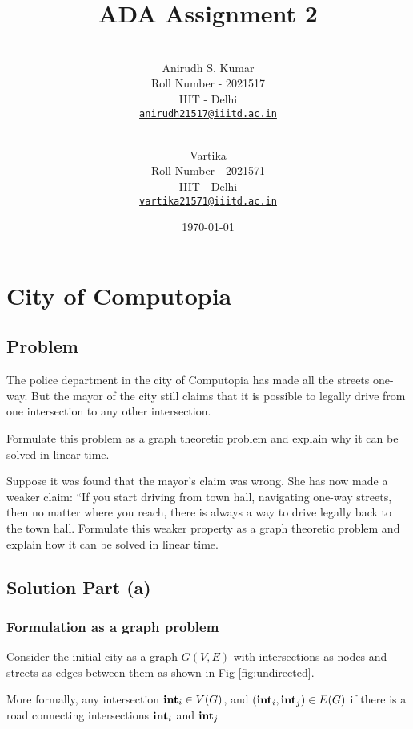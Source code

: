 \documentclass[12pt]{article}
\title{ADA Assignment 2}
\author{
    \\\vspace{0em} Anirudh S. Kumar \\\vspace{-0.5em}
    \footnotesize{Roll Number - 2021517}\\\vspace{-0.5em}
    \footnotesize{IIIT - Delhi}\\\vspace{-0.5em}
    \footnotesize{\href{mailto:anirudh21517@iiitd.ac.in}{\texttt{anirudh21517@iiitd.ac.in}}}
  \and
    \\\vspace{0em} Vartika\\\vspace{-0.5em}
    \footnotesize{Roll Number - 2021571}\\\vspace{-0.5em}
    \footnotesize{IIIT - Delhi}\\\vspace{-0.5em}
    \footnotesize{\href{mailto:vartika21571@iiitd.ac.in}{\texttt{vartika21571@iiitd.ac.in}}}
    \vspace{1em}
}
\date{\today}
\newenvironment{statement}{\color[rgb]{1.00,0.00,0.50} {}}{}
\begin{document}
\maketitle

\pagestyle{fancy}
\fancyhf{}
\fancyfoot[C]{\thepage}

\section{City of Computopia}
\subsection{Problem}
\begin{statement}
    The police department in the city of Computopia has made all the streets one-way.
But the mayor of the city still claims that it is possible to legally drive from one intersection to any
other intersection.

\begin{alphalist}
    \item Formulate this problem as a graph theoretic problem and explain why it can be solved in linear time.

    \item Suppose it was found that the mayor’s claim was wrong. She has now made a weaker claim: “If
you start driving from town hall, navigating one-way streets, then no matter where you reach,
there is always a way to drive legally back to the town hall. Formulate this weaker property as
a graph theoretic problem and explain how it can be solved in linear time.
\end{alphalist}
\end{statement}


\subsection{Solution Part \textbf{(a)}}



\subsubsection{Formulation as a graph problem}
Consider the initial city as a graph $G(V, E)$ with intersections as nodes and streets as edges between them as shown in Fig \ref{fig:undirected}.

More formally, any intersection ${\textrm{\textbf{int}}}_i \in V(G)$, and $({\textrm{\textbf{int}}}_i, {\textrm{\textbf{int}}}_j) \in E(G)$ if there is a road connecting intersections ${\textrm{\textbf{int}}}_i$ and ${\textrm{\textbf{int}}}_j$
\end{document}
